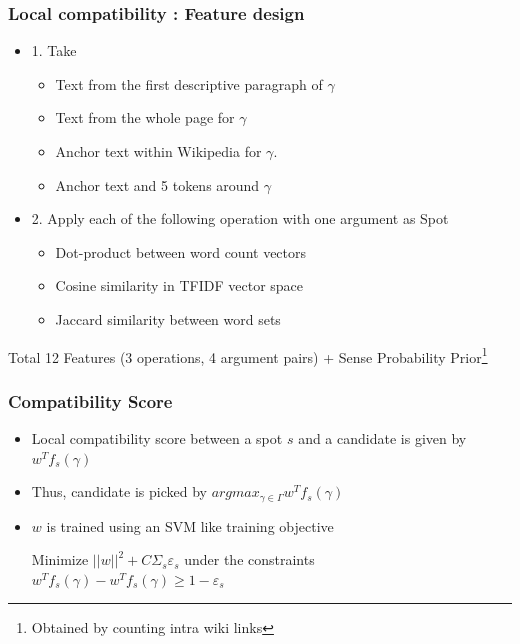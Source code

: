 \begin{frame}

\frametitle{Local compatibility : Feature design} 
\begin{itemize}
 \item 1. Take
\begin{itemize} 
 \item Text from the first descriptive paragraph of $\gamma$
  \item Text from the whole page for $\gamma$
  \item Anchor text within Wikipedia for $\gamma$.
  \item Anchor text and 5 tokens around $\gamma$ 
 \end{itemize}
 
 \item 2. Apply each of the following operation with one argument as Spot
    \begin{itemize}
      \item{Dot-product between word count vectors}
      \item{Cosine similarity in TFIDF vector space}
      \item{Jaccard similarity between word sets}
 \end{itemize} 
 \end{itemize}
 Total 12 Features (3 operations, 4 argument pairs) + Sense Probability Prior\footnote{Obtained by counting intra wiki links}
 
\end{frame}

\begin{frame}
 \frametitle{Compatibility Score}
 \begin{itemize}
 \item Local compatibility score between a spot $s$ and a candidate is given by $w^{T}f_s(\gamma)$ \medskip
 \item Thus, candidate is picked by $argmax_{\gamma\in\Gamma}w^{T}f_s(\gamma)$ \medskip
 \item $w$ is trained using an SVM like training objective 
 
 \begin{center} 
 Minimize $||w||^2 + C\Sigma_{s}\varepsilon_s$
 under the constraints
 $w^{T}f_s(\gamma) - w^{T}f_s(\gamma) \geq 1 - \varepsilon_s$ \end{center}
 \end{itemize}
 
 \end{frame}

